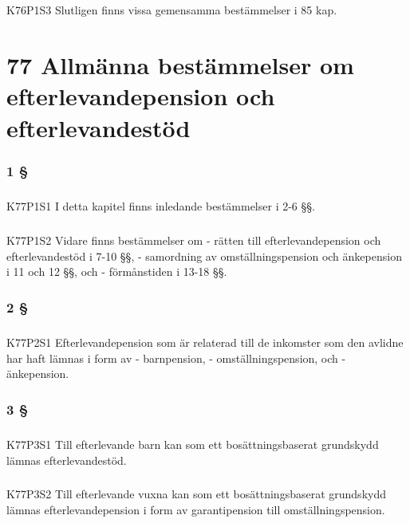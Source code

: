 \documentclass[a4paper,notitlepage,openany,10pt]{book}
\begin{document}
\paragraph*{}
{\tiny K76P1S3}
Slutligen finns vissa gemensamma bestämmelser i 85 kap.
\chapter*{77 Allmänna bestämmelser om efterlevandepension och efterlevandestöd}
\subsection*{1 §}
\paragraph*{}
{\tiny K77P1S1}
I detta kapitel finns inledande bestämmelser i 2-6 §§.
\paragraph*{}
{\tiny K77P1S2}
Vidare finns bestämmelser om
\newline - rätten till efterlevandepension och efterlevandestöd i 7-10 §§,
\newline - samordning av omställningspension och änkepension i 11 och 12 §§, och
\newline - förmånstiden i 13-18 §§.
\subsection*{2 §}
\paragraph*{}
{\tiny K77P2S1}
Efterlevandepension som är relaterad till de inkomster som den avlidne har haft lämnas i form av
\newline - barnpension,
\newline - omställningspension, och
\newline - änkepension.
\subsection*{3 §}
\paragraph*{}
{\tiny K77P3S1}
Till efterlevande barn kan som ett bosättningsbaserat grundskydd lämnas efterlevandestöd.
\paragraph*{}
{\tiny K77P3S2}
Till efterlevande vuxna kan som ett bosättningsbaserat grundskydd lämnas efterlevandepension i form av garantipension till omställningspension.
\end{document}
